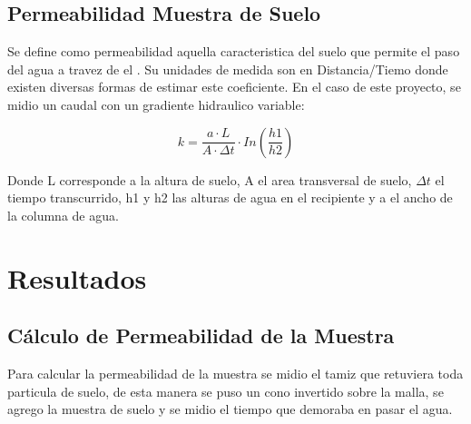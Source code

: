 \subsection{Permeabilidad Muestra de Suelo}

Se define como permeabilidad aquella caracteristica del suelo que permite el paso del agua a travez de el \textbf{\cite{permeabilidad_suelos}}. Su unidades de medida son en Distancia/Tiemo donde existen diversas formas de estimar este coeficiente. En el caso de este proyecto, se midio un caudal con un gradiente hidraulico variable:

\begin{equation}
    k = \frac{a \cdot L}{A \cdot \Delta t} \cdot In(\frac{h1}{h2})
\end{equation}

Donde L corresponde a la altura de suelo, A el area transversal de suelo, $\Delta t$ el tiempo transcurrido, h1 y h2 las alturas de agua en el recipiente y a el ancho de la columna de agua.

\newpage
\section{Resultados}

\subsection{Cálculo de Permeabilidad de la Muestra}

Para calcular la permeabilidad de la muestra se midio el tamiz que retuviera toda particula de suelo, de esta manera se puso un cono invertido sobre la malla, se agrego la muestra de suelo y se midio el tiempo que demoraba en pasar el agua. 

